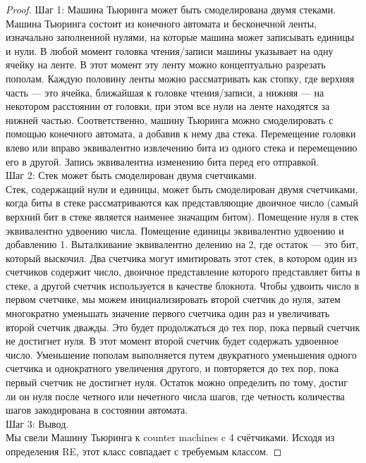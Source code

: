     \begin{proof}
        Шаг 1: Машина Тьюринга может быть смоделирована двумя стеками.\\
        Машина Тьюринга состоит из конечного автомата и бесконечной ленты, изначально заполненной нулями, на которые машина может записывать единицы и нули. В любой момент головка чтения/записи машины указывает на одну ячейку на ленте. В этот момент эту ленту можно концептуально разрезать пополам. Каждую половину ленты можно рассматривать как стопку, где верхняя часть — это ячейка, ближайшая к головке чтения/записи, а нижняя — на некотором расстоянии от головки, при этом все нули на ленте находятся за нижней частью. Соответственно, машину Тьюринга можно смоделировать с помощью конечного автомата, а добавив к нему два стека. Перемещение головки влево или вправо эквивалентно извлечению бита из одного стека и перемещению его в другой. Запись эквивалентна изменению бита перед его отправкой.\\
        Шаг 2: Стек может быть смоделирован двумя счетчиками.\\
        Стек, содержащий нули и единицы, может быть смоделирован двумя счетчиками, когда биты в стеке рассматриваются как представляющие двоичное число (самый верхний бит в стеке является наименее значащим битом). Помещение нуля в стек эквивалентно удвоению числа. Помещение единицы эквивалентно удвоению и добавлению 1. Выталкивание эквивалентно делению на 2, где остаток --- это бит, который выскочил. Два счетчика могут имитировать этот стек, в котором один из счетчиков содержит число, двоичное представление которого представляет биты в стеке, а другой счетчик используется в качестве блокнота. Чтобы удвоить число в первом счетчике, мы можем инициализировать второй счетчик до нуля, затем многократно уменьшать значение первого счетчика один раз и увеличивать второй счетчик дважды. Это будет продолжаться до тех пор, пока первый счетчик не достигнет нуля. В этот момент второй счетчик будет содержать удвоенное число. Уменьшение пополам выполняется путем двукратного уменьшения одного счетчика и однократного увеличения другого, и повторяется до тех пор, пока первый счетчик не достигнет нуля. Остаток можно определить по тому, достиг ли он нуля после четного или нечетного числа шагов, где четность количества шагов закодирована в состоянии автомата.\\
        Шаг 3: Вывод.\\
        Мы свели Машину Тьюринга к counter machines c 4 счётчиками. Исходя из определения RE, этот класс совпадает с требуемым классом.
    \end{proof}
    
